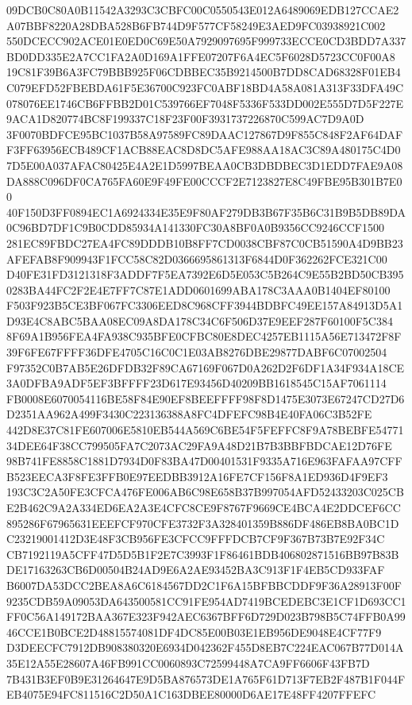 \documentclass[UTF8,fontset=fandol,zihao=-4,a4paper]{ctexart}
\begin{document}
{{09DCB0C80A0B11542A3293C3CBFC00C0550543E012A6489069EDB127CCAE2A07BBF8220A28DBA528B6FB744D9F577CF58249E3AED9FC03938921C002
550DCECC902ACE01E0ED0C69E50A7929097695F999733ECCE0CD3BDD7A337BD0DD335E2A7CC1FA2A0D169A1FFE07207F6A4EC5F6028D5723CC0F00A8
19C81F39B6A3FC79BBB925F06CDBBEC35B9214500B7DD8CAD68328F01EB4C079EFD52FBEBDA61F5E36700C923FC0ABF18BD4A58A081A313F33DFA49C
078076EE1746CB6FFBB2D01C539766EF7048F5336F533DD002E555D7D5F227E9ACA1D820774BC8F199337C18F23F00F3931737226870C599AC7D9A0D
3F0070BDFCE95BC1037B58A97589FC89DAAC127867D9F855C848F2AF64DAFF3FF63956ECB489CF1ACB88EAC8D8DC5AFE988AA18AC3C89A480175C4D0
7D5E00A037AFAC80425E4A2E1D5997BEAA0CB3DBDBEC3D1EDD7FAE9A08DA888C096DF0CA765FA60E9F49FE00CCCF2E7123827E8C49FBE95B301B7E00
40F150D3FF0894EC1A6924334E35E9F80AF279DB3B67F35B6C31B9B5DB89DA0C96BD7DF1C9B0CDD85934A141330FC30A8BF0A0B9356CC9246CCF1500
281EC89FBDC27EA4FC89DDDB10B8FF7CD0038CBF87C0CB51590A4D9BB23AFEFAB8F909943F1FCC58C82D0366695861313F6844D0F362262FCE321C00
D40FE31FD3121318F3ADDF7F5EA7392E6D5E053C5B264C9E55B2BD50CB3950283BA44FC2F2E4E7FF7C87E1ADD0601699ABA178C3AAA0B1404EF80100
F503F923B5CE3BF067FC3306EED8C968CFF3944BDBFC49EE157A84913D5A1D93E4C8ABC5BAA08EC09A8DA178C34C6F506D37E9EEF287F60100F5C384
8F69A1B956FEA4FA938C935BFE0CFBC80E8DEC4257EB1115A56E713472F8F39F6FE67FFFF36DFE4705C16C0C1E03AB8276DBE29877DABF6C07002504
F97352C0B7AB5E26DFDB32F89CA67169F067D0A262D2F6DF1A34F934A18CE3A0DFBA9ADF5EF3BFFFF23D617E93456D40209BB1618545C15AF7061114
FB0008E6070054116BE58F84E90EF8BEEFFFF98F8D1475E3073E67247CD27D6D2351AA962A499F3430C223136388A8FC4DFEFC98B4E40FA06C3B52FE
442D8E37C81FE607006E5810EB544A569C6BE54F5FEFFC8F9A78BEBFE5477134DEE64F38CC799505FA7C2073AC29FA9A48D21B7B3BBFBDCAE12D76FE
98B741FE8858C1881D7934D0F83BA47D00401531F9335A716E963FAFAA97CFFB523EECA3F8FE3FFB0E97EEDBB3912A16FE7CF156F8A1ED936D4F9EF3
193C3C2A50FE3CFCA476FE006AB6C98E658B37B997054AFD52433203C025CBE2B462C9A2A334ED6EA2A3E4CFC8CE9F8767F9669CE4BCA4E2DDCEF6CC
895286F67965631EEEFCF970CFE3732F3A328401359B886DF486EB8BA0BC1DC23219001412D3E48F3CB956FE3CFCC9FFFDCB7CF9F367B73B7E92F34C
CB7192119A5CFF47D5D5B1F2E7C3993F1F86461BDB406802871516BB97B83BDE17163263CB6D00504B24AD9E6A2AE93452BA3C913F1F4EB5CD933FAF
B6007DA53DCC2BEA8A6C6184567DD2C1F6A15BFBBCDDF9F36A28913F00F9235CDB59A09053DA643500581CC91FE954AD7419BCEDEBC3E1CF1D693CC1
FF0C56A149172BAA367E323F942AEC6367BFF6D729D023B798B5C74FFB0A9946CCE1B0BCE2D48815574081DF4DC85E00B03E1EB956DE9048E4CF77F9
D3DEECFC7912DB908380320E6934D042362F455D8EB7C224EAC067B77D014A35E12A55E28607A46FB991CC0060893C72599448A7CA9FF6606F43FB7D
7B431B3EF0B9E31264647E9D5BA876573DE1A765F61D713F7EB2F487B1F044FEB4075E94FC811516C2D50A1C163DBEE80000D6AE17E48FF4207FFEFC
}}
\end{document}
